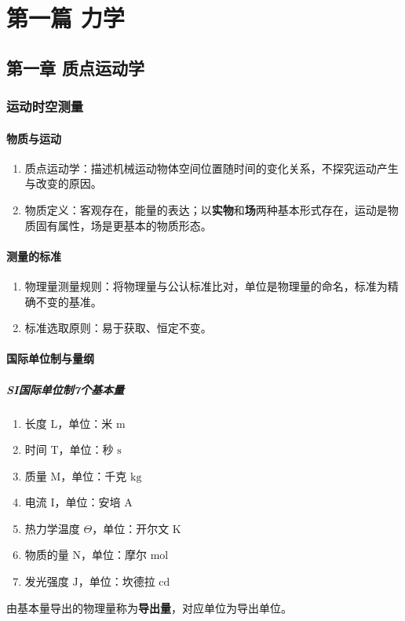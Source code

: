 \part{第一篇 力学}
\chapter{第一章 质点运动学}

\section{运动时空测量}
    \subsection{物质与运动}
    \begin{enumerate}
        \item 质点运动学：描述机械运动物体空间位置随时间的变化关系，不探究运动产生与改变的原因。
        \item 物质定义：客观存在，能量的表达；以\textbf{实物}和\textbf{场}两种基本形式存在，运动是物质固有属性，场是更基本的物质形态。
    \end{enumerate}

    \subsection{测量的标准}
    \begin{enumerate}
        \item 物理量测量规则：将物理量与公认标准比对，单位是物理量的命名，标准为精确不变的基准。
        \item 标准选取原则：易于获取、恒定不变。
    \end{enumerate}

    \subsection{国际单位制与量纲}
    \subsubsection{SI国际单位制7个基本量}
    \begin{enumerate}
        \item 长度 $\mathrm{L}$，单位：米 $\mathrm{m}$
        \item 时间 $\mathrm{T}$，单位：秒 $\mathrm{s}$
        \item 质量 $\mathrm{M}$，单位：千克 $\mathrm{kg}$
        \item 电流 $\mathrm{I}$，单位：安培 $\mathrm{A}$
        \item 热力学温度 $\varTheta$，单位：开尔文 $\mathrm{K}$
        \item 物质的量 $\mathrm{N}$，单位：摩尔 $\mathrm{mol}$
        \item 发光强度 $\mathrm{J}$，单位：坎德拉 $\mathrm{cd}$
    \end{enumerate}
    由基本量导出的物理量称为\textbf{导出量}，对应单位为导出单位。

